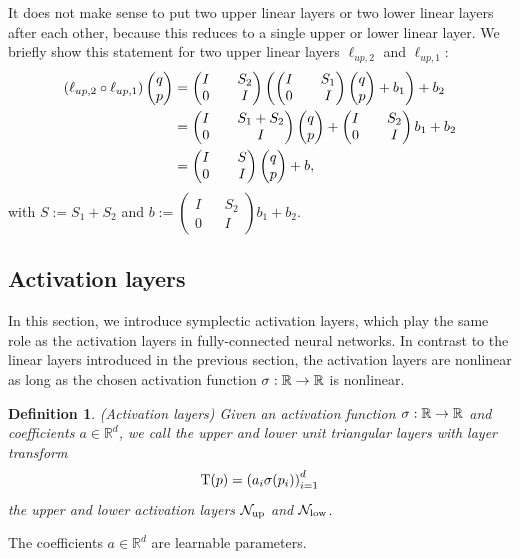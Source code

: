 \documentclass[twoside,a4paper]{article}
\newtheorem{definition}{Definition}
\begin{document}
It does not make sense to put two upper linear layers or two lower linear layers after each other,
because this reduces to a single upper or lower linear layer.
We briefly show this statement for two upper linear layers $\ell_{up,2}$ and $\ell_{up,1}$:
\begin{align*}
	\left( \ell_{up,2} \circ \ell_{up,1} \right) \begin{pmatrix} q \\ p \end{pmatrix} &=
	\begin{pmatrix}
		I && S_2 \\
		0 && I
	\end{pmatrix}
	\left(
	\begin{pmatrix}
		I && S_1 \\
		0 && I
	\end{pmatrix}
	\begin{pmatrix} q \\ p \end{pmatrix} + b_1
	\right) + b_2 \\
	&= \begin{pmatrix}
		I && S_1 + S_2 \\
		0 && I
	\end{pmatrix} \begin{pmatrix} q \\ p \end{pmatrix}
	+ \begin{pmatrix}
		I && S_2 \\
		0 && I
	\end{pmatrix} b_1
	+ b_2 \\
	&= \begin{pmatrix}
		I && S \\
		0 && I
	\end{pmatrix} \begin{pmatrix} q \\ p \end{pmatrix} + b
	,
\end{align*}
with $S := S_1 + S_2$ and $b := \begin{pmatrix}
	I && S_2 \\
	0 && I
\end{pmatrix} b_1
+ b_2$.

\subsection{Activation layers}
In this section, we introduce symplectic activation layers, which play the same role
as the activation layers in fully-connected neural networks.
In contrast to the linear layers introduced in the previous section,
the activation layers are nonlinear as long as the chosen activation
function $\sigma : \mathbb{R} \to \mathbb{R}$ is nonlinear.

\begin{definition}
	(Activation layers)
	Given an activation function $\sigma : \mathbb{R} \to \mathbb{R}$ and coefficients $a \in \mathbb{R}^d$, 
	we call the upper and lower unit triangular layers with layer transform
	\begin{equation*}
		\mathrm{T}(p) = \left( a_i \sigma(p_i) \right)_{i=1}^d
	\end{equation*}
	the upper and lower activation layers $\mathcal{N}_{\text{up}}$ and $\mathcal{N}_{\text{low}}$.
\end{definition}
The coefficients $a \in \mathbb{R}^d$ are learnable parameters.
\end{document}
